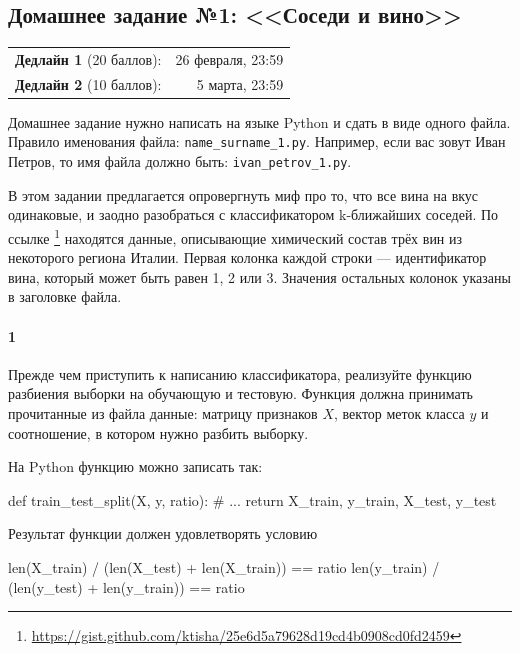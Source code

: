 \documentclass[a4paper,12pt]{article}
\begin{document}
\subsection*{Домашнее задание №1: <<Соседи и вино>>}

\begin{tabular}{@{}lr}
  \textbf{Дедлайн 1} (20 баллов): & 26 февраля, 23:59 \\
  \textbf{Дедлайн 2} (10 баллов): & 5 марта, 23:59
\end{tabular}

Домашнее задание нужно написать на языке Python и сдать в виде одного файла.
Правило именования файла: \texttt{name\_surname\_1.py}. Например, если
вас зовут Иван Петров, то имя файла должно быть: \texttt{ivan\_petrov\_1.py}.

\makebox[\linewidth]{\hrulefill}

В этом задании предлагается опровергнуть миф про то, что все вина на вкус
одинаковые, и заодно разобраться с классификатором k-ближайших соседей. По ссылке%
\footnote{\url{https://gist.github.com/ktisha/25e6d5a79628d19cd4b0908cd0fd2459}}
находятся данные, описывающие химический состав трёх вин из некоторого региона
Италии. Первая колонка каждой строки --- идентификатор вина, который может быть
равен 1, 2 или 3. Значения остальных колонок указаны в заголовке файла.

\paragraph{1} Прежде чем приступить к написанию классификатора, реализуйте
функцию разбиения выборки на обучающую и тестовую. Функция должна принимать
прочитанные из файла данные: матрицу признаков $X$, вектор меток класса $y$ и
соотношение, в котором нужно разбить выборку.

На Python функцию можно записать так:
\begin{python3}
def train_test_split(X, y, ratio):
    # ...
    return X_train, y_train, X_test, y_test
\end{python3}

Результат функции должен удовлетворять условию
\begin{python3}
len(X_train) / (len(X_test) + len(X_train)) == ratio
len(y_train) / (len(y_test) + len(y_train)) == ratio
\end{python3}
\end{document}

